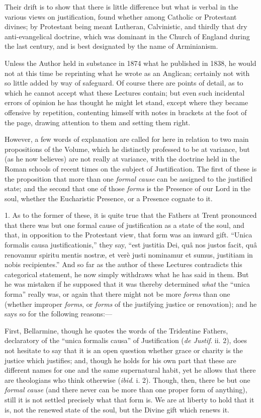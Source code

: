 Their drift is to show that there is little difference but what is
verbal in the various views on justification, found whether among
Catholic or Protestant divines; by Protestant being meant Lutheran,
Calvinistic, and thirdly that dry anti-evangelical doctrine, which was
dominant in the Church of England during the last century, and is best
designated by the name of Arminianism.


Unless the Author held in substance in 1874 what he published in
1838, he would not at this time be reprinting what he wrote as an
Anglican; certainly not with so little added by way of safeguard. Of
course there are points of detail, as to which he cannot accept what
these Lectures contain; but even such incidental errors of opinion he
has thought he might let stand, except where they became offensive by
repetition, contenting himself with notes in brackets at the foot of
the page, drawing attention to them and setting them right.


However, a few words of explanation are called for here in relation
to two main propositions of the Volume, which he distinctly professed
to be at variance, but (as he now believes) are not really at
variance, with the doctrine held in the Roman schools of recent times
on the subject of Justification. The first of these is the proposition
that more than one \emph{formal cause} can be assigned to the
justified state; and the second that one of those \emph{forms} is the
Presence of our Lord in the soul, whether the Eucharistic Presence, or
a Presence cognate to it.


1. As to the former of these, it is quite true that the Fathers at
Trent pronounced that there was but one formal cause of justification
as a state of the soul, and that, in opposition to the Protestant
view, that form was an inward gift. ``Unica formalis causa
justificationis,'' they say, ``est justitia Dei, quâ nos
justos facit, quâ renovamur spiritu mentis nostræ, et verè justi
nominamur et sumus, justitiam in nobis recipientes.'' And so far
as the author of these Lectures contradicts this categorical
statement, he now simply withdraws what he has said in them. But he
was mistaken if he supposed that it was thereby determined \emph{what}
the ``unica forma'' really was, or again that there might not
be more \emph{forms} than one (whether improper \emph{forms}, or \emph{forms}
of the justifying justice or renovation); and he says so for the
following reasons:—


First, Bellarmine, though he quotes the words of the Tridentine
Fathers, declaratory of the ``unica formalis causa'' of
Justification (\emph{de Justif}. ii. 2), does not hesitate to say that
it is an open question whether grace or charity is the justice which
justifies; and, though he holds for his own part that these are
different names for one and the same supernatural habit, yet he allows
that there are theologians who think otherwise (\emph{ibid}. i. 2).
Though, then, there be but one \emph{formal cause} (and there never
can be more than one proper form of anything), still it is not settled
precisely what that form is. We are at liberty to hold that it is, not
the renewed state of the soul, but the Divine gift which renews it.


